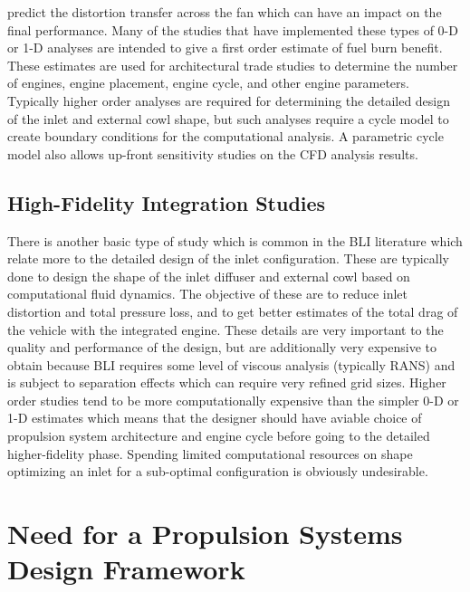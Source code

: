 \documentclass[12pt]{gatech-thesis}
\begin{document}
predict the distortion transfer across the fan which can have an impact on the final performance.  Many of the studies that have implemented these types of 0-D or 1-D analyses are intended to give a first order estimate of fuel burn benefit. These estimates are used for architectural trade studies to determine the number of engines, engine placement, engine cycle, and other engine parameters. Typically higher order analyses are required for determining the detailed design of the inlet and external cowl shape, but such analyses require a cycle model to create boundary conditions for the computational analysis. A parametric cycle model also allows up-front sensitivity studies on the CFD analysis results.

\subsection{High-Fidelity Integration Studies}

There is another basic type of study which is common in the BLI literature which relate more to the detailed design of the inlet configuration. These are typically done to design the shape of the inlet diffuser and external cowl based on computational fluid dynamics. The objective of these are to reduce inlet distortion and total pressure loss, and to get better estimates of the total drag of the vehicle with the integrated engine.  These details are very important to the quality and performance of the design, but are additionally very expensive to obtain because BLI requires some level of viscous analysis (typically RANS) and is subject to separation effects which can require very refined grid sizes. Higher order studies tend to be more computationally expensive than the simpler 0-D or 1-D estimates which means that the designer should have aviable choice of propulsion system architecture and engine cycle before going to the detailed higher-fidelity phase. Spending limited computational resources on shape optimizing an inlet for a sub-optimal configuration is obviously undesirable.

\section{Need for a Propulsion Systems Design Framework}
\end{document}
